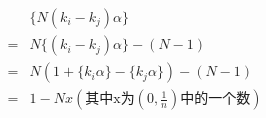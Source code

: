 \documentclass[preview]{standalone}
\begin{document}
\begin{align*}
&\{N(k_i-k_j)\alpha\}\\ =&N\{(k_i-k_j)\alpha\}-(N-1)\\ =&N(1+\{k_i\alpha\}-\{k_j\alpha\})-(N-1)\\ =&1-Nx(\text{其中x为}(0,\frac{1}{n})\text{中的一个数})
\end{align*}
\end{document}
